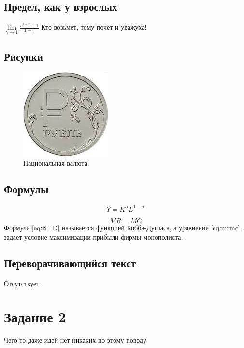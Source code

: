 \documentclass[12pt, a4paper]{article}
\theoremstyle{plain}              %
\theoremstyle{definition}         %
\begin{document}
	\subsection{Предел, как у взрослых}
	\newcommand{\llim}[2]{\ensuremath{\lim\limits_{#1}#2}} %
	
	\llim{\gamma \to 1}{\frac{c^{1-\gamma}-1}{1-\gamma}} Кто возьмет, тому почет и уважуха!
	
	\subsection{Рисунки}
	
	\renewcommand{\thefigure}{\thesection:\arabic{figure}}
	
	\begin{figure} [h!]
		\begin{center}
			\caption{Национальная валюта}
			\includegraphics{Rubl1.jpg}
		\end{center}
	\end{figure}
	
	\subsection{Формулы}
	\renewcommand{\theequation}{Eq.(\arabic{equation})}
	
	\begin{equation} \label{eq:K_D}
	Y=K^\alpha L^{1-\alpha}
	\end{equation}
	
	
	\begin{equation}\label{eq:mrmc}
	MR=MC
	\end{equation}
	Формула \eqref{eq:K_D} называется функцией Кобба-Дугласа, а уравнение \eqref{eq:mrmc} задает условие максимизации прибыли фирмы-монополиста.
	\subsection{Переворачивающийся текст}
	Отсутствует
	
	\section{Задание 2}
	Чего-то даже идей нет никаких по этому поводу
	
	
\end{document}
